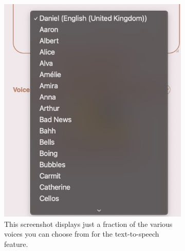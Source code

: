 \documentclass{l4proj}
\begin{document}
\begin{figure}
    \centering
    \begin{subfigure}[b]{0.4\textwidth}
        \includegraphics[width=\textwidth]{dissertation/images/voices.jpeg}
        \caption{This screenshot displays just a fraction of the various voices you can choose from for the text-to-speech feature.}
        \label{fig:voices}
    \end{subfigure}
    \begin{subfigure}[b]{0.3\textwidth}

\end{subfigure}
\end{figure}
\end{document}
